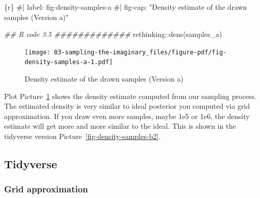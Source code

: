 \documentclass[
  letterpaper,
  DIV=11,
  numbers=noendperiod]{scrreprt}
\newenvironment{Shaded}{\begin{snugshade}}{\end{snugshade}}
\newcommand{\CommentTok}[1]{\textcolor[rgb]{0.37,0.37,0.37}{#1}}
\newcommand{\DocumentationTok}[1]{\textcolor[rgb]{0.37,0.37,0.37}{\textit{#1}}}
\newcommand{\FunctionTok}[1]{\textcolor[rgb]{0.28,0.35,0.67}{#1}}
\newcommand{\InformationTok}[1]{\textcolor[rgb]{0.37,0.37,0.37}{#1}}
\newcommand{\NormalTok}[1]{\textcolor[rgb]{0.00,0.23,0.31}{#1}}
\newcommand{\SpecialCharTok}[1]{\textcolor[rgb]{0.37,0.37,0.37}{#1}}
\begin{document}
\begin{Shaded}
\begin{Highlighting}[]
\InformationTok{\textasciigrave{}\textasciigrave{}\textasciigrave{}\{r\}}
\CommentTok{\#| label: fig{-}density{-}samples{-}a}
\CommentTok{\#| fig{-}cap: "Density estimate of the drawn samples (Version a)"}

\DocumentationTok{\#\# R code 3.5 \#\#\#\#\#\#\#\#\#\#\#\#\#}
\NormalTok{rethinking}\SpecialCharTok{::}\FunctionTok{dens}\NormalTok{(samples\_a)}
\InformationTok{\textasciigrave{}\textasciigrave{}\textasciigrave{}}
\end{Highlighting}
\end{Shaded}

\begin{figure}[H]

{\centering \texttt{[image: 03-sampling-the-imaginary\_files/figure-pdf/fig-density-samples-a-1.pdf]}

}

\caption{\label{fig-density-samples-a}Density estimate of the drawn
samples (Version a)}

\end{figure}

Plot Picture~\ref{fig-density-samples-a} shows the density estimate
computed from our sampling process. The estimated density is very
similar to ideal posterior you computed via grid approximation. If you
draw even more samples, maybe 1e5 or 1e6, the density estimate will get
more and more similar to the ideal. This is shown in the tidyverse
version Picture~\ref{fig-density-samples-b2}.

\hypertarget{tidyverse-10}{%
\subsection{Tidyverse}\label{tidyverse-10}}

\hypertarget{grid-approximation-2}{%
\subsubsection{Grid approximation}\label{grid-approximation-2}}
\end{document}
